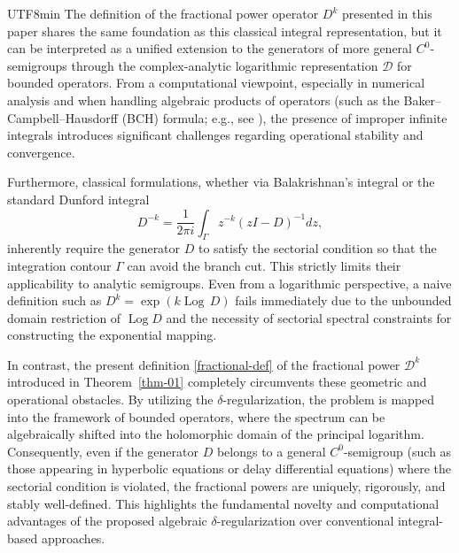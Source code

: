 \documentclass[10pt,a4paper]{article}
\theoremstyle{definition}
\theoremstyle{remark}
\begin{document}
\begin{CJK}{UTF8}{min}
The definition of the fractional power operator $D^k$ presented in this paper shares the same foundation as this classical integral representation, but it can be interpreted as a unified extension to the generators of more general $C^0$-semigroups through the complex-analytic logarithmic representation $\mathcal{D}$ for bounded operators.
From a computational viewpoint, especially in numerical analysis and when handling algebraic products of operators (such as the Baker--Campbell--Hausdorff (BCH) formula; e.g., see \cite{26iwata_bch}), the presence of improper infinite integrals introduces significant challenges regarding operational stability and convergence.

Furthermore, classical formulations, whether via Balakrishnan's integral or the standard Dunford integral
\begin{equation} \label{dunford-int}
D^{-k} = \frac{1}{2\pi i} \int_{\Gamma} z^{-k} (zI - D)^{-1} dz,
\end{equation}
inherently require the generator $D$ to satisfy the sectorial condition so that the integration contour $\Gamma$ can avoid the branch cut. 
This strictly limits their applicability to analytic semigroups. 
Even from a logarithmic perspective, a naive definition such as $D^k = \exp(k \operatorname{Log} \, D)$ fails immediately due to the unbounded domain restriction of $\operatorname{Log} D$ and the necessity of sectorial spectral constraints for constructing the exponential mapping.

In contrast, the present definition \eqref{fractional-def} of the fractional power $\mathcal{D}^k$ introduced in Theorem~\ref{thm-01} completely circumvents these geometric and operational obstacles. 
By utilizing the $\delta$-regularization, the problem is mapped into the framework of bounded operators, where the spectrum can be algebraically shifted into the holomorphic domain of the principal logarithm. 
Consequently, even if the generator $D$ belongs to a general $C^0$-semigroup (such as those appearing in hyperbolic equations or delay differential equations) where the sectorial condition is violated, the fractional powers are uniquely, rigorously, and stably well-defined. 
This highlights the fundamental novelty and computational advantages of the proposed algebraic $\delta$-regularization over conventional integral-based approaches.


\end{CJK}
\end{document}
